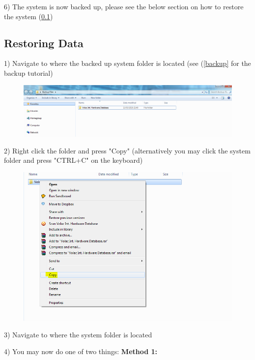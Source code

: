 6) The system is now backed up, please see the below section on how to restore the system (\ref{restore})

\subsection{Restoring Data}\label{restore}

1) Navigate to where the backed up system folder is located (see (\ref{backup} for the backup tutorial)

\begin{figure}[H]
    \includegraphics[width=\textwidth]{./Manual/Images/restore1.png}
\end{figure}

2) Right click the folder and press "Copy" (alternatively you may click the system folder and press "CTRL+C" on the keyboard)

\begin{figure}[H]
    \includegraphics[width=\textwidth]{./Manual/Images/restore2.png}
\end{figure}

3) Navigate to where the system folder is located

4) You may now do one of two things:
\newline
\textbf{Method 1:}

